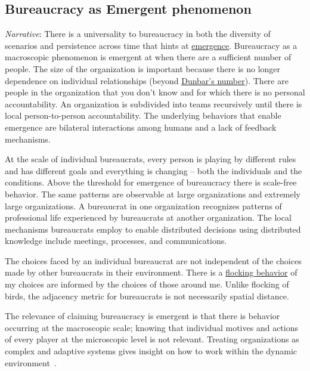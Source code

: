 

\subsection*{Bureaucracy as Emergent phenomenon}

\textit{Narrative}: There is a universality to bureaucracy in both the diversity of scenarios and persistence across time that hints at \href{https://en.wikipedia.org/wiki/Emergence}{emergence}. Bureaucracy as a macroscopic phenomenon is emergent at when there are a sufficient number of people. The size of the organization is important because there is no longer dependence on individual relationships (beyond \href{https://en.wikipedia.org/wiki/Dunbar\%27s_number}{Dunbar's number}). There are people in the organization that you don't know and for which there is no personal accountability. An organization is subdivided into teams recursively until there is local person-to-person accountability.  The underlying behaviors that enable emergence are bilateral interactions among humans and a lack of feedback mechanisms. 

At the scale of individual bureaucrats, every person is playing by different rules and has different goals and everything is changing -- both the individuals and the conditions. 
Above the threshold for emergence of bureaucracy there is scale-free behavior. The same patterns are observable at large organizations and extremely large organizations. A bureaucrat in one organization recognizes patterns of professional life experienced by bureaucrats at another organization. The local mechanisms bureaucrats employ to enable distributed decisions using distributed knowledge include meetings, processes, and communications. 

The choices faced by an individual bureaucrat are not independent of the choices made by other bureaucrats in their environment. There is a \href{https://en.wikipedia.org/wiki/Flocking_(behavior)}{flocking behavior} of my choices are informed by the choices of those around me. Unlike flocking of birds, the adjacency metric for bureaucrats is not necessarily spatial distance.


The relevance of claiming bureaucracy is emergent is that there is behavior occurring at the macroscopic scale; knowing that individual motives and actions of every player at the microscopic level is not relevant. Treating organizations as complex and adaptive systems gives insight on how to work within the dynamic environment~\cite{2011_Eisenhardt}.


